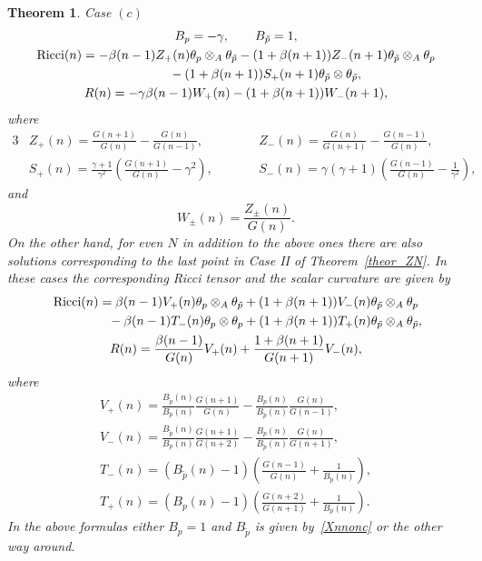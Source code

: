 \documentclass[pdftex]{sigma}
\numberwithin{equation}{section}
\newtheorem{Theorem}{Theorem}[section]
\newcommand{\ip}{{\tilde{p}}}
\begin{document}
\begin{Theorem}
Case $(c)$
\begin{gather*}
 B_p=-\gamma, \qquad B_\ip=1, \\
{\rm Ricci}(n) = -\beta(n-1)Z_+(n)\theta_p\otimes_A\theta_{\ip}-(1+\beta(n+1))Z_-(n+1)\theta_\ip\otimes_A\theta_p\\
\hphantom{{\rm Ricci}(n) =}{} -(1+\beta(n+1))S_+(n+1)\theta_\ip\otimes\theta_\ip,\\
R(n) =-\gamma\beta(n-1)W_+(n)-(1+\beta(n+1))W_-(n+1),
\end{gather*}
where
\begin{alignat*}{3}
 &Z_+(n) = \frac{G(n+1)}{G(n)}-\frac{G(n)}{G(n-1)},\qquad && Z_-(n) = \frac{G(n)}{G(n+1)}-\frac{G(n-1)}{G(n)},& \\
 & S_+(n)=\frac{\gamma+1}{\gamma^2}\left(\frac{G(n+1)}{G(n)}-\gamma^2\right),\qquad && S_-(n)=\gamma(\gamma+1)\left(\frac{G(n-1)}{G(n)}-\frac{1}{\gamma^2}\right),&
\end{alignat*}
and
\[
W_\pm(n) = \frac{Z_\pm(n)}{G(n)}.
\]
On the other hand, for even $N$ in addition to the above ones there are also solutions corresponding to the last point in Case II of Theorem~{\rm \ref{theor_ZN}}. In these cases the corresponding Ricci tensor and the scalar curvature are given by
\begin{gather*}
{\rm Ricci}(n) =\beta(n-1)V_+(n)\theta_p\otimes_A\theta_\ip+(1+\beta(n+1))V_-(n)\theta_\ip\otimes_A\theta_p\\
\hphantom{{\rm Ricci}(n) =}{} -\beta(n-1)T_-(n)\theta_p\otimes \theta_p +(1+\beta(n+1))T_+(n)\theta_\ip\otimes_A\theta_\ip, \\
 R(n)=\frac{\beta(n-1)}{G(n)}V_+(n)+\frac{1+\beta(n+1)}{G(n+1)}V_-(n),
\end{gather*}
where
\begin{gather*}
 V_+(n)=\frac{B_\ip(n)}{B_p(n)}\frac{G(n+1)}{G(n)}-\frac{B_p(n)}{B_\ip(n)}\frac{G(n)}{G(n-1)}, \\ V_-(n)=\frac{B_\ip(n)}{B_p(n)}\frac{G(n+1)}{G(n+2)}-\frac{B_p(n)}{B_\ip(n)}\frac{G(n)}{G(n+1)},\\
T_-(n)=(B_\ip(n)-1)\left(\frac{G(n-1)}{G(n)}+\frac{1}{B_\ip(n)}\right), \\ T_+(n)=(B_p(n)-1)\left(\frac{G(n+2)}{G(n+1)}+\frac{1}{B_p(n)}\right).
\end{gather*}
In the above formulas either $B_p=1$ and $B_\ip$ is given by~\eqref{Xnnonc} or the other way around.
\end{Theorem}
\end{document}
